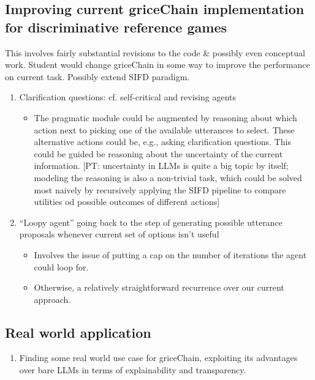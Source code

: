 \documentclass[fleqn,reqno,10pt]{article}
\newcommand{\pt}[1]{\textcolor{CSP-accent-1}{[PT: #1]}}
\begin{document}
\subsection{Improving current griceChain implementation for discriminative reference games}

This involves fairly substantial revisions to the code \& possibly even conceptual work.  Student would change griceChain in some way to improve the performance on current task. Possibly extend SIFD paradigm.

\begin{enumerate}
    \item Clarification questions: cf. self-critical and revising agents
    \begin{itemize}
        \item The pragmatic module could be augmented by reasoning about which action next to picking one of the available utterances to select. These alternative actions could be, e.g., asking clarification questions. This could be guided be reasoning about the uncertainty of the current information. \pt{uncertainty in LLMs is quite a big topic by itself; modeling the reasoning is also a non-trivial task, which could be solved most naively by recursively applying the SIFD pipeline to compare utilities od possible outcomes of different actions}
    \end{itemize}
    \item ``Loopy agent'' going back to the step of generating possible utterance proposals whenever current set of options isn't useful
    \begin{itemize}
        \item Involves the issue of putting a cap on the number of iterations the agent could loop for.
        \item Otherwise, a relatively straightforward recurrence over our current approach.
    \end{itemize}
\end{enumerate}

\subsection{Real world application}

\begin{enumerate}
\item Finding some real world use case for griceChain, exploiting its advantages over bare LLMs in terms of explainability and transparency.
\end{enumerate}
\end{document}
